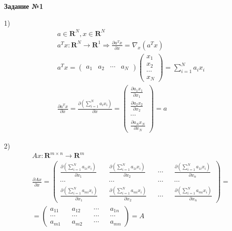 \documentclass{report}
\begin{document}
\newpage
\par \textbf{Задание №1}

\par 1)
\begin{align*}
& a \in \mathbf{R}^N, x \in \mathbf{R}^N \\
& a^T x: \mathbf{R}^N \rightarrow \mathbf{R}^1 \Rightarrow \frac{\partial a^T x}{\partial x} = \nabla_x (a^T x) \\
& a^T x = \begin{pmatrix} a_1 & a_2 & \cdots & a_N \end{pmatrix} \begin{pmatrix} x_1 \\ x_2 \\ \cdots \\ x_N \end{pmatrix} = \sum_{i=1}^{N} a_i x_i \\
& \frac{\partial a^T x}{\partial x} = \frac{\partial \left( \sum_{i=1}^{N} a_i x_i \right)}{\partial x} = \begin{pmatrix} \frac{\partial a_1 x_1}{\partial x_1} \\ \frac{\partial a_2 x_2}{\partial x_2} \\ \cdots \\ \frac{\partial a_N x_N}{\partial x_N} \end{pmatrix} = a
\end{align*}

\par 2)
\begin{align*}
& Ax: \mathbf{R}^{m \times n} \rightarrow \mathbf{R}^m \\
& \frac{\partial Ax}{\partial x} = \begin{pmatrix}
\frac{\partial \left( \sum_{i=1}^{N} a_{1i} x_i \right)}{\partial x_1} &&
\frac{\partial \left( \sum_{i=1}^{N} a_{1i} x_i \right)}{\partial x_2} &&
\cdots &&
\frac{\partial \left( \sum_{i=1}^{N} a_{1i} x_i \right)}{\partial x_n} \\
\cdots && \cdots && \cdots && \cdots \\
\frac{\partial \left( \sum_{i=1}^{N} a_{mi} x_i \right)}{\partial x_1} &&
\frac{\partial \left( \sum_{i=1}^{N} a_{mi} x_i \right)}{\partial x_2} &&
\cdots &&
\frac{\partial \left( \sum_{i=1}^{N} a_{mi} x_i \right)}{\partial x_n}
\end{pmatrix} = \\
& = \begin{pmatrix}
a_{11}  && a_{12} && \cdots && a_{1n} \\
\cdots && \cdots && \cdots && \cdots \\
a_{m1}  && a_{m2} && \cdots && a_{m n}
\end{pmatrix} = A
\end{align*}
\end{document}
